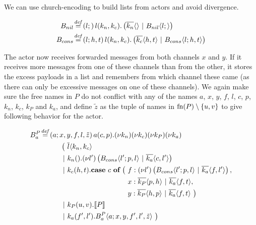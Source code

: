 We can use church-encoding to build lists from actors and avoid divergence.


\begin{align*}
  \adef*{B_{nil}}{l}{}{\arcv{l}{k_n,k_c} . \parens{\asnd{k_n}{} \apar \ains{B_{nil}}{l}{}}}
  \\
  \adef*{B_{cons}}{l}{h,t}{\arcv{l}{k_n,k_c} . \parens{\asnd{k_c}{h,t} \apar \ains{B_{cons}}{l}{h,t}}}
\end{align*}

The actor now receives forwarded messages from both channels $x$ and $y$.
If it receives more messages from one of these channels than from the other,
it stores the excess payloads in a list and remembers from which channel
these came (as there can only be excessive messages on one of these channels).
We again make sure the free names in $P$ do not conflict with any of the names
$a$, $x$, $y$, $f$, $l$, $c$, $p$, $k_n$, $k_c$, $k_P$ and $k_a$,
and define $\tilde{z}$
as the tuple of names in $\operatorname{fn}(P) \setminus {\{u, v\}}$
to give following behavior for the actor.

\begin{align*}
  \adef*{B_a^P}{a}{x,y,f,l,\tilde{z}}{\arcv{a}{c,p} . \anew{k_n}{\anew{k_c}{\anew{k_P}{\anew{k_a}{
    \\
    &\hspace{1cm}
    \begin{aligned}[t]
      \big(\ &\asnd{l}{k_n,k_c}
      \\
      \apar  &\arcv{k_n}{} . \anew{l'}{\parens{\ains{B_{cons}}{l'}{p, l} \apar \asnd{k_a}{c, l'}}}
      \\
      \apar  &\arcv{k_c}{h,t} .
        \begin{aligned}[t]
          \acse*{c}{
          \ &\aalt{f}{\anew{l'}{\parens{\ains{B_{cons}}{l'}{p, l} \apar \asnd{k_a}{f, l'}}}}, \\
            &\aalt{x}{\asnd{k_P}{p,h} \apar \asnd{k_a}{f,t}}, \\
            &\aalt{y}{\asnd{k_P}{h,p} \apar \asnd{k_a}{f,t}}
          \ }
        \end{aligned}
      \\
      \apar  &\arcv{k_P}{u,v} . \encMJtoAP{P}
      \\
      \apar  &\arcv{k_a}{f',l'} . \ains{B_a^P}{a}{x, y, f', l',\tilde{z}}
      \ \big)
    \end{aligned}
  }}}}} \\
\end{align*}

